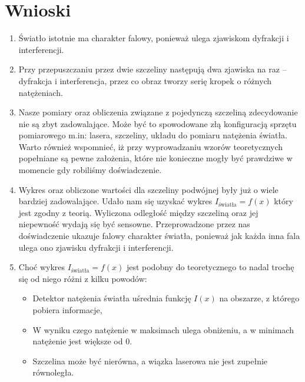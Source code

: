 \documentclass{fizykalab}
\begin{document}
\section{Wnioski}
\begin{enumerate}
    \item Światło istotnie ma charakter falowy,
          ponieważ ulega zjawiskom dyfrakcji i interferencji.
    \item Przy przepuszczaniu przez dwie szczeliny następują dwa zjawiska na
            raz – dyfrakcja i interferencja, przez co obraz tworzy serię kropek o
            różnych natężeniach.
    \item Nasze pomiary oraz obliczenia związane z pojedynczą szczeliną zdecydowanie
          nie są zbyt zadowalające. Może być to spowodowane złą 
          konfiguracją sprzętu pomiarowego m.in: lasera, szczeliny, układu do pomiaru
          natężenia światła. Warto również wspomnieć, iż przy wyprowadzaniu
          wzorów teoretycznych popełniane są pewne założenia, które nie konieczne 
          mogły być prawdziwe w momencie gdy robiliśmy doświadczenie.
    \item Wykres oraz obliczone wartości dla szczeliny  podwójnej były już o
    wiele bardziej zadowalające. Udało nam się uzyskać wykres
    $I_\text{światła} = f(x)$ który jest zgodny z teorią. Wyliczona odległość 
    między szczeliną oraz jej niepewność
    wydają się być sensowne. Przeprowadzone przez nas doświadczenie 
    ukazuje falowy charakter światła, ponieważ jak każda inna fala
    ulega ono zjawisku dyfrakcji i interferencji.
    \item 
    Choć wykres $I_\text{światła} = f(x)$ jest podobny do teoretycznego to nadal
    trochę się od niego różni z  kilku powodów:
        \begin{itemize}
            \item Detektor natężenia światła uśrednia funkcję $I(x)$ 
            na obszarze, z którego pobiera informacje,
            \item  W wyniku czego natężenie w maksimach ulega obniżeniu,
                   a w minimach natężenie jest większe od 0.
            \item  Szczelina może być nierówna, a wiązka laserowa nie
            jest  zupełnie równoległa.
        \end{itemize}
        
\end{enumerate}


% 
% 
\end{document}
